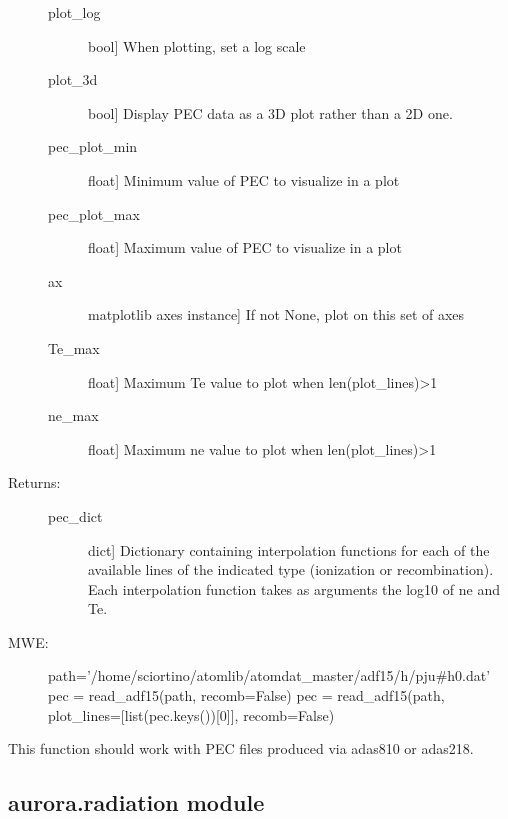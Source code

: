 \documentclass[letterpaper,10pt,english]{sphinxmanual}
\begin{document}
\begin{fulllineitems}
\begin{description}
\begin{description}
\item[{plot\_log}] \leavevmode{[}bool{]}
When plotting, set a log scale

\item[{plot\_3d}] \leavevmode{[}bool{]}
Display PEC data as a 3D plot rather than a 2D one.

\item[{pec\_plot\_min}] \leavevmode{[}float{]}
Minimum value of PEC to visualize in a plot

\item[{pec\_plot\_max}] \leavevmode{[}float{]}
Maximum value of PEC to visualize in a plot

\item[{ax}] \leavevmode{[}matplotlib axes instance{]}
If not None, plot on this set of axes

\item[{Te\_max}] \leavevmode{[}float{]}
Maximum Te value to plot when len(plot\_lines)\textgreater{}1

\item[{ne\_max}] \leavevmode{[}float{]}
Maximum ne value to plot when len(plot\_lines)\textgreater{}1

\end{description}

\item[{Returns:}] \leavevmode\begin{description}
\item[{pec\_dict}] \leavevmode{[}dict{]}
Dictionary containing interpolation functions for each of the available lines of the
indicated type (ionization or recombination). Each interpolation function takes as arguments
the log\sphinxhyphen{}10 of ne and Te.

\end{description}

\item[{MWE:}] \leavevmode
path=’/home/sciortino/atomlib/atomdat\_master/adf15/h/pju\#h0.dat’
pec = read\_adf15(path, recomb=False)
pec = read\_adf15(path, plot\_lines={[}list(pec.keys()){[}0{]}{]}, recomb=False)

\end{description}

This function should work with PEC files produced via adas810 or adas218.

\end{fulllineitems}



\subsection{aurora.radiation module}
\label{\detokenize{aurora:module-aurora.radiation}}\label{\detokenize{aurora:aurora-radiation-module}}
\end{document}
